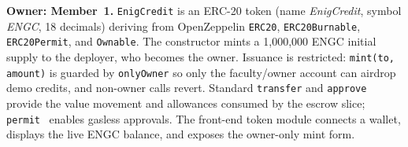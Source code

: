 \textbf{Owner: Member~1.} \texttt{EnigCredit} is an ERC-20 token (name \emph{EnigCredit}, symbol \emph{ENGC}, 18 decimals) deriving from OpenZeppelin \texttt{ERC20}, \texttt{ERC20Burnable}, \texttt{ERC20Permit}, and \texttt{Ownable}. The constructor mints a 1{,}000{,}000 ENGC initial supply to the deployer, who becomes the owner. Issuance is restricted: \texttt{mint(to, amount)} is guarded by \texttt{onlyOwner} so only the faculty/owner account can airdrop demo credits, and non-owner calls revert. Standard \texttt{transfer} and \texttt{approve} provide the value movement and allowances consumed by the escrow slice; \texttt{permit}~\cite{eip2612} enables gasless approvals. The front-end token module connects a wallet, displays the live ENGC balance, and exposes the owner-only mint form.

